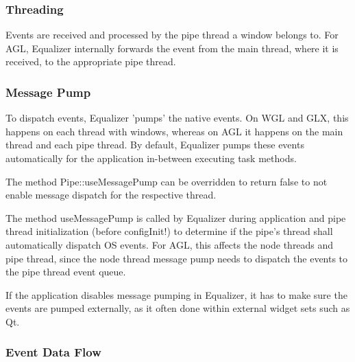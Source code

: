 \documentclass[10pt,a4]{scrartcl}
\begin{document}
\subsubsection{Threading}

Events are received and processed by the pipe thread a window belongs
to. For AGL, Equalizer internally forwards the event from the main
thread, where it is received, to the appropriate pipe thread.

\subsubsection{\label{sMessagePump}Message Pump}

To dispatch events, Equalizer 'pumps' the native events. On WGL and GLX,
this happens on each thread with windows, whereas on AGL it happens on
the main thread and each pipe thread. By default, Equalizer pumps these
events automatically for the application in-between executing task
methods.

The method \textsf{Pipe::useMessagePump} can be overridden to return
\textsf{false} to not enable message dispatch for the respective thread.

The method \textsf{useMessagePump} is called by Equalizer during
application and pipe thread initialization (before configInit!) to
determine if the pipe's thread shall automatically dispatch OS
events. For AGL, this affects the node threads and pipe thread, since
the node thread message pump needs to dispatch the events to the pipe
thread event queue.

If the application disables message pumping in Equalizer, it has to make
sure the events are pumped externally, as it often done within external
widget sets such as Qt.

\subsubsection{Event Data Flow}
\end{document}
